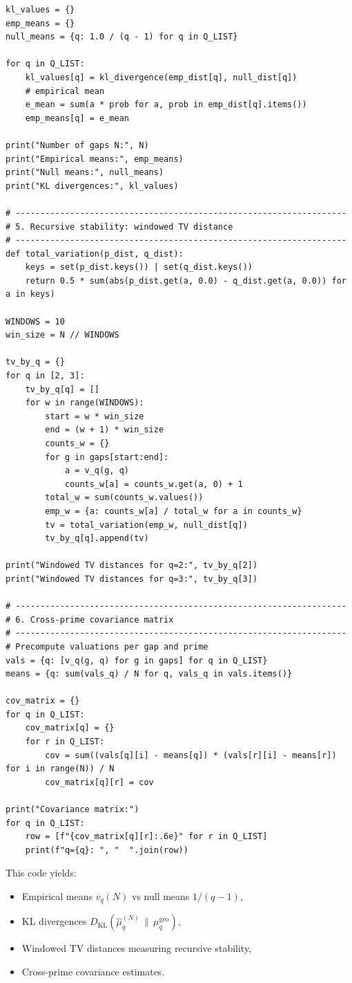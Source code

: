 \documentclass[11pt]{article}
\theoremstyle{definition}
\theoremstyle{plain}
\theoremstyle{remark}
\newcommand{\1}{\mathbb{1}}
\begin{document}
\begin{verbatim}
kl_values = {}
emp_means = {}
null_means = {q: 1.0 / (q - 1) for q in Q_LIST}

for q in Q_LIST:
    kl_values[q] = kl_divergence(emp_dist[q], null_dist[q])
    # empirical mean
    e_mean = sum(a * prob for a, prob in emp_dist[q].items())
    emp_means[q] = e_mean

print("Number of gaps N:", N)
print("Empirical means:", emp_means)
print("Null means:", null_means)
print("KL divergences:", kl_values)

# -------------------------------------------------------------------
# 5. Recursive stability: windowed TV distance
# -------------------------------------------------------------------
def total_variation(p_dist, q_dist):
    keys = set(p_dist.keys()) | set(q_dist.keys())
    return 0.5 * sum(abs(p_dist.get(a, 0.0) - q_dist.get(a, 0.0)) for a in keys)

WINDOWS = 10
win_size = N // WINDOWS

tv_by_q = {}
for q in [2, 3]:
    tv_by_q[q] = []
    for w in range(WINDOWS):
        start = w * win_size
        end = (w + 1) * win_size
        counts_w = {}
        for g in gaps[start:end]:
            a = v_q(g, q)
            counts_w[a] = counts_w.get(a, 0) + 1
        total_w = sum(counts_w.values())
        emp_w = {a: counts_w[a] / total_w for a in counts_w}
        tv = total_variation(emp_w, null_dist[q])
        tv_by_q[q].append(tv)

print("Windowed TV distances for q=2:", tv_by_q[2])
print("Windowed TV distances for q=3:", tv_by_q[3])

# -------------------------------------------------------------------
# 6. Cross-prime covariance matrix
# -------------------------------------------------------------------
# Precompute valuations per gap and prime
vals = {q: [v_q(g, q) for g in gaps] for q in Q_LIST}
means = {q: sum(vals_q) / N for q, vals_q in vals.items()}

cov_matrix = {}
for q in Q_LIST:
    cov_matrix[q] = {}
    for r in Q_LIST:
        cov = sum((vals[q][i] - means[q]) * (vals[r][i] - means[r]) for i in range(N)) / N
        cov_matrix[q][r] = cov

print("Covariance matrix:")
for q in Q_LIST:
    row = [f"{cov_matrix[q][r]:.6e}" for r in Q_LIST]
    print(f"q={q}: ", "  ".join(row))
\end{verbatim}

This code yields:

\begin{itemize}[leftmargin=*]
  \item Empirical means \(\overline{v}_q(N)\) vs null means \(1/(q-1)\),
  \item KL divergences \(D_{\mathrm{KL}}(\hat{\mu}_q^{(N)}\,\|\,\mu_q^{\mathrm{geo}})\),
  \item Windowed TV distances measuring recursive stability,
  \item Cross-prime covariance estimates.
\end{itemize}
\end{document}
